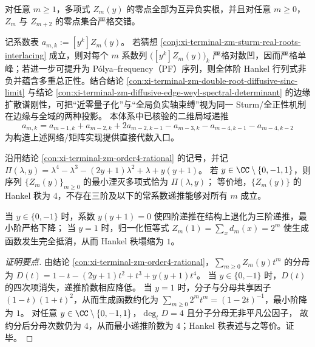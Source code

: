 \begin{conjecture}[负实轴完全性与全尺度交错]\label{conj:xi-terminal-zm-sturm-real-roots-interlacing}
对任意 \(m\ge 1\)，多项式 \(Z_m(y)\) 的零点全部为互异负实根，并且对任意 \(m\ge 0\)，\(Z_m\) 与 \(Z_{m+2}\) 的零点集合严格交错。
\end{conjecture}

\begin{remark}[一种结构性证明路线]\label{rem:xi-terminal-zm-sturm-proof-route}
记系数表 \(a_{m,k}:=[y^k]Z_m(y)\)。
若猜想 \ref{conj:xi-terminal-zm-sturm-real-roots-interlacing} 成立，则对每个 \(m\) 系数列 \(\bigl([y^k]Z_m(y)\bigr)_k\) 严格对数凹，因而严格单峰；若进一步可提升为 P\'olya--frequency（PF）序列，则全体阶 Hankel 行列式非负并蕴含多重总正性。结合结论 \ref{con:xi-terminal-zm-double-root-diffusive-sinc-limit} 与结论 \ref{con:xi-terminal-zm-diffusive-edge-weyl-spectral-determinant} 的边缘扩散谱刚性，可把“近零量子化”与“全局负实轴束缚”视为同一 Sturm/全正性机制在边缘与全域的两种投影。
本体系中已核验的二维局域递推
\[
a_{m,k}=a_{m-1,k}+a_{m-2,k}+2a_{m-2,k-1}-a_{m-3,k}-a_{m-4,k-1}-a_{m-4,k-2}
\]
为构造上述网络/矩阵实现提供直接代数入口。
\end{remark}

\begin{conclusion}\label{con:xi-terminal-zm-hankel-rank4}
沿用结论 \ref{con:xi-terminal-zm-order4-rational} 的记号，并记
\(
\Pi(\lambda,y)=\lambda^4-\lambda^3-(2y+1)\lambda^2+\lambda+y(y+1)
\)。
若 \(y\in\CC\setminus\{0,-1,1\}\)，则
序列 \(\{Z_m(y)\}_{m\ge 0}\) 的最小湮灭多项式恰为 \(\Pi(\lambda,y)\)；
等价地，\(\{Z_m(y)\}\) 的 Hankel 秩为 \(4\)，不存在三阶及以下的常系数递推能够对所有 \(m\) 成立。
\par
当 \(y\in\{0,-1\}\) 时，系数 \(y(y+1)=0\) 使四阶递推在结构上退化为三阶递推，最小阶严格下降；
当 \(y=1\) 时，归一化恒等式 \(Z_m(1)=\sum_x d_m(x)=2^m\) 使生成函数发生完全抵消，从而 Hankel 秩塌缩为 \(1\)。
\end{conclusion}
\begin{proof}[证明要点]
由结论 \ref{con:xi-terminal-zm-order4-rational}，\(\sum_{m\ge 0}Z_m(y)t^m\) 的分母为
\(
D(t)=1-t-(2y+1)t^2+t^3+y(y+1)t^4
\)。
当 \(y\in\{0,-1\}\) 时，\(D(t)\) 的四次项消失，递推阶数相应降低。
当 \(y=1\) 时，分子与分母共享因子 \((1-t)(1+t)^2\)，从而生成函数约化为 \(\sum_{m\ge 0}2^m t^m=(1-2t)^{-1}\)，最小阶降为 \(1\)。
对任意 \(y\in\CC\setminus\{0,-1,1\}\)，\(\deg_t D=4\) 且分子分母无非平凡公因子，
故约分后分母次数仍为 \(4\)，从而最小递推阶数为 \(4\)；Hankel 秩表述与之等价。证毕。
\end{proof}

